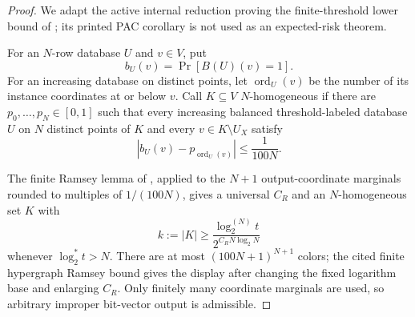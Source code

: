 \begin{proof}
We adapt the active internal reduction proving the finite-threshold lower
bound of \citet{alonLivniMalliarisMoran2019}; its printed PAC corollary is
not used as an expected-risk theorem.

For an \(N\)-row database \(U\) and \(v\in V\), put
\[
b_U(v)=\Pr[B(U)(v)=1].
\]
For an increasing database on distinct points, let
\(\operatorname{ord}_U(v)\) be the number of its instance coordinates at
or below \(v\).  Call \(K\subseteq V\) \(N\)-homogeneous if there are
\(p_0,\ldots,p_N\in[0,1]\) such that every increasing balanced
threshold-labeled database \(U\) on \(N\) distinct points of \(K\) and
every \(v\in K\setminus U_X\) satisfy
\begin{equation}\label{eq:step-008-homogeneity}
\left|b_U(v)-p_{\operatorname{ord}_U(v)}\right|
\le\frac1{100N}.
\end{equation}

The finite Ramsey lemma of \citet{alonLivniMalliarisMoran2019}, applied to
the \(N+1\) output-coordinate marginals rounded to multiples of
\(1/(100N)\), gives a universal \(C_R\) and an \(N\)-homogeneous set
\(K\) with
\begin{equation}\label{eq:step-008-ramsey-lower}
k:=|K|\ge
\frac{\log_2^{(N)}t}{2^{C_RN\log_2N}}
\end{equation}
whenever \(\log_2^*t>N\).  There are at most
\((100N+1)^{N+1}\) colors; the cited finite hypergraph Ramsey bound gives
the display after changing the fixed logarithm base and enlarging \(C_R\).
Only finitely many coordinate marginals are used, so arbitrary improper
bit-vector output is admissible.


\end{proof}
